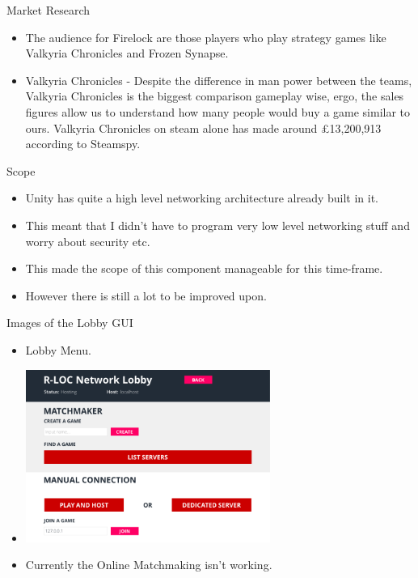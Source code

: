 \documentclass{beamer}
\begin{document}
\begin{frame}{Market Research}
	\begin{itemize}
		\item The audience for Firelock are those players who play strategy games like Valkyria Chronicles and Frozen Synapse.  \pause
\item Valkyria Chronicles - Despite the difference in man power between the teams, Valkyria Chronicles is the biggest comparison gameplay wise, ergo, the sales figures allow us to understand how many people would buy a game similar to ours. Valkyria
Chronicles on steam alone has made around £13,200,913 according to Steamspy. \pause
	\end{itemize}
\end{frame}


\begin{frame}{Scope}
	\begin{itemize}
		\item Unity has quite a high level networking architecture already built in it.  \pause
		\item This meant that I didn't have to program very low level networking stuff and worry about security etc. \pause
		\item This made the scope of this component manageable for this time-frame. \pause
		\item However there is still a lot to be improved upon.
	\end{itemize}
\end{frame}

\begin{frame}{Images of the Lobby GUI}
	\begin{itemize}
		\item Lobby Menu. \pause
		\item \includegraphics[width=8cm]{LobbyGUI} \pause
		\item Currently the Online Matchmaking isn't working.
	\end{itemize}
\end{frame}
\end{document}
